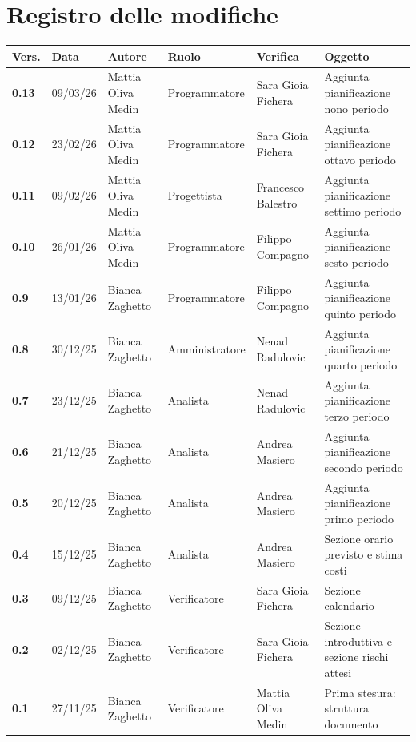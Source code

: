 \documentclass[a4paper,12pt]{article}
\begin{document}


\newpage
\section*{Registro delle modifiche}
\begin{xltabular}{\textwidth}{|l|l|X|l|X|X|}
\hline
\textbf{Vers.} & \textbf{Data} & \textbf{Autore} & \textbf{Ruolo} & \textbf{Verifica} & \textbf{Oggetto} \\
\hline
\endhead
\endfoot
\hline
\endlastfoot
\textbf{0.13} & 09/03/26 & Mattia Oliva Medin & Programmatore & Sara Gioia Fichera & Aggiunta pianificazione nono periodo \\
\hline
\textbf{0.12} & 23/02/26 & Mattia Oliva Medin & Programmatore & Sara Gioia Fichera & Aggiunta pianificazione ottavo periodo \\
\hline
\textbf{0.11} & 09/02/26 & Mattia Oliva Medin & Progettista & Francesco Balestro & Aggiunta pianificazione settimo periodo \\
\hline
\textbf{0.10} & 26/01/26 & Mattia Oliva Medin & Programmatore & Filippo Compagno & Aggiunta pianificazione sesto periodo \\
\hline
\textbf{0.9} & 13/01/26 & Bianca Zaghetto & Programmatore & Filippo Compagno & Aggiunta pianificazione quinto periodo \\
\hline
\textbf{0.8} & 30/12/25 & Bianca Zaghetto & Amministratore & Nenad Radulovic & Aggiunta pianificazione quarto periodo \\
\hline
\textbf{0.7} & 23/12/25 & Bianca Zaghetto & Analista & Nenad Radulovic & Aggiunta pianificazione terzo periodo \\
\hline
\textbf{0.6} & 21/12/25 & Bianca Zaghetto & Analista & Andrea Masiero & Aggiunta pianificazione secondo periodo \\
\hline
\textbf{0.5} & 20/12/25 & Bianca Zaghetto & Analista & Andrea Masiero & Aggiunta pianificazione primo periodo \\
\hline
\textbf{0.4} & 15/12/25 & Bianca Zaghetto & Analista & Andrea Masiero & Sezione orario previsto e stima costi \\
\hline
\textbf{0.3} & 09/12/25 & Bianca Zaghetto & Verificatore & Sara Gioia Fichera & Sezione calendario \\
\hline
\textbf{0.2} & 02/12/25 & Bianca Zaghetto & Verificatore & Sara Gioia Fichera & Sezione introduttiva e sezione rischi attesi \\
\hline
\textbf{0.1} & 27/11/25 & Bianca Zaghetto & Verificatore & Mattia Oliva Medin & Prima stesura: struttura documento \\
\hline
\end{xltabular}
\end{document}
